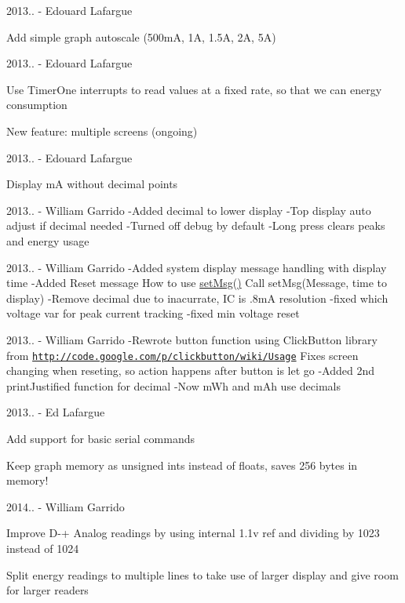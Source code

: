 2013.. -\/ Edouard Lafargue
\begin{DoxyItemize}
\item Add simple graph autoscale (500mA, 1A, 1.\+5A, 2A, 5A)
\end{DoxyItemize}

2013.. -\/ Edouard Lafargue
\begin{DoxyItemize}
\item Use Timer\+One interrupts to read values at a fixed rate, so that we can energy consumption
\item New feature\+: multiple screens (ongoing)
\end{DoxyItemize}

2013.. -\/ Edouard Lafargue
\begin{DoxyItemize}
\item Display mA without decimal points
\end{DoxyItemize}

2013.. -\/ William Garrido -\/\+Added decimal to lower display -\/\+Top display auto adjust if decimal needed -\/\+Turned off debug by default -\/\+Long press clears peaks and energy usage

2013.. -\/ William Garrido -\/\+Added system display message handling with display time -\/\+Added Reset message How to use \hyperlink{_u_s_b___tester___o_l_e_d__128x64___beta__2_82_8ino_a0387211b0ea0866fc96dfcf7bd3ba0bd}{set\+Msg()} Call set\+Msg(\+Message, time to display) -\/\+Remove decimal due to inacurrate, IC is .8mA resolution -\/fixed which voltage var for peak current tracking -\/fixed min voltage reset

2013.. -\/ William Garrido -\/\+Rewrote button function using Click\+Button library from \href{http://code.google.com/p/clickbutton/wiki/Usage}{\tt http\+://code.\+google.\+com/p/clickbutton/wiki/\+Usage} Fixes screen changing when reseting, so action happens after button is let go -\/\+Added 2nd print\+Justified function for decimal -\/\+Now m\+Wh and m\+Ah use decimals

2013.. -\/ Ed Lafargue
\begin{DoxyItemize}
\item Add support for basic serial commands
\item Keep graph memory as unsigned ints instead of floats, saves 256 bytes in memory!
\end{DoxyItemize}

2014.. -\/ William Garrido
\begin{DoxyItemize}
\item Improve D-\/+ Analog readings by using internal 1.\+1v ref and dividing by 1023 instead of 1024
\item Split energy readings to multiple lines to take use of larger display and give room for larger readers
\end{DoxyItemize}

